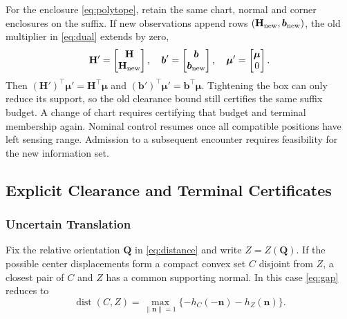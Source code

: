\documentclass[journal]{IEEEtran}
\theoremstyle{definition}
\newcommand{\vct}[1]{\boldsymbol{#1}}
\newcommand{\mtx}[1]{\mathbf{#1}}
\begin{document}
For the enclosure \eqref{eq:polytope}, retain the same chart, normal
and corner enclosures on the suffix. If new observations append rows
$(\mtx H_{\rm new},\vct b_{\rm new})$, the old multiplier in
\eqref{eq:dual} extends by zero,
\begin{equation*}
 \mtx H'=\begin{bmatrix}\mtx H\\ \mtx H_{\rm new}\end{bmatrix},\quad
 \vct b'=\begin{bmatrix}\vct b\\ \vct b_{\rm new}\end{bmatrix},\quad
 \vct\mu'=\begin{bmatrix}\vct\mu\\0\end{bmatrix}.
\end{equation*}
Then $(\mtx H')^\top\vct\mu'=\mtx H^\top\vct\mu$ and
$(\vct b')^\top\vct\mu'=\vct b^\top\vct\mu$. Tightening the box can
only reduce its support, so the old clearance bound still certifies the
same suffix budget. A change of chart requires certifying that budget
and terminal membership again.
Nominal control resumes once all compatible positions have left sensing
range. Admission to a subsequent encounter requires feasibility for the
new information set.

\subsection{Explicit Clearance and Terminal Certificates}
\subsubsection{Uncertain Translation}
Fix the relative orientation $\mtx Q$ in \eqref{eq:distance} and write
$Z=Z(\mtx Q)$. If the possible center displacements form a compact
convex set $C$ disjoint from $Z$, a closest pair of $C$ and $Z$
has a common supporting normal. In this case \eqref{eq:gap} reduces to
\begin{equation*}
 \operatorname{dist}(C,Z)=
 \max_{\|\vct n\|=1}\{-h_C(-\vct n)-h_Z(\vct n)\}.
\end{equation*}
\end{document}
